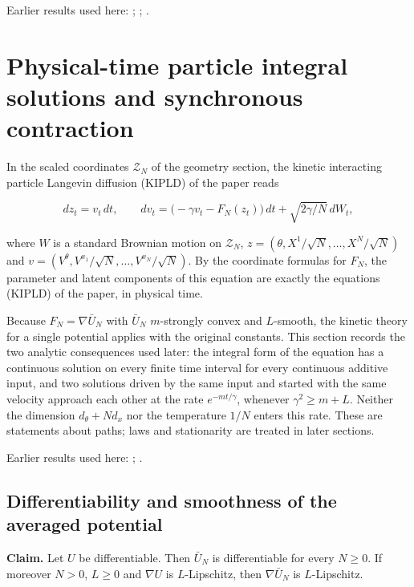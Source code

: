 \documentclass[11pt,a4paper]{report}
\begin{document}
Earlier results used here: \cite[Section~3.33.6]{LangevinLean2026ULASC}; \cite[Section~3.1.1]{LangevinLean2026IPLA}; \cite[Section~3.12.2]{LangevinLean2026Kinetic}.
\section{\texorpdfstring{Physical-time particle integral solutions and synchronous contraction}{Physical-time particle integral solutions and synchronous contraction}}
\label{proof-module-KIPLMC-Dynamics-lean}


In the scaled coordinates \(\mathcal Z_N\) of the geometry section, the kinetic interacting particle Langevin diffusion (KIPLD) of the paper reads


\[dz_t=v_t\,dt,\qquad dv_t=\bigl(-\gamma v_t-F_N(z_t)\bigr)\,dt+\sqrt{2\gamma/N}\,dW_t,\]


where \(W\) is a standard Brownian motion on \(\mathcal Z_N\), \(z=(\theta,X^1/\sqrt N,\dots,X^N/\sqrt N)\) and \(v=(V^\theta,V^{x_1}/\sqrt N,\dots,V^{x_N}/\sqrt N)\). By the coordinate formulas for \(F_N\), the parameter and latent components of this equation are exactly the equations (KIPLD) of the paper, in physical time.




Because \(F_N=\nabla\bar U_N\) with \(\bar U_N\) \(m\)-strongly convex and \(L\)-smooth, the kinetic theory for a single potential applies with the original constants. This section records the two analytic consequences used later: the integral form of the equation has a continuous solution on every finite time interval for every continuous additive input, and two solutions driven by the same input and started with the same velocity approach each other at the rate \(e^{-mt/\gamma}\), whenever \(\gamma^2\ge m+L\). Neither the dimension \(d_\theta+Nd_x\) nor the temperature \(1/N\) enters this rate. These are statements about paths; laws and stationarity are treated in later sections.



Earlier results used here: \cite[Section~3.1]{LangevinLean2026Kinetic}; \cite[Section~3.6]{LangevinLean2026Kinetic}.
\subsection{\texorpdfstring{Differentiability and smoothness of the averaged potential}{Differentiability and smoothness of the averaged potential}}
\label{report-step-KIPLMC-Dynamics-lean-1}


\textbf{Claim.} Let \(U\) be differentiable. Then \(\bar U_N\) is differentiable for every \(N\ge0\). If moreover \(N>0\), \(L\ge0\) and \(\nabla U\) is \(L\)-Lipschitz, then \(\nabla\bar U_N\) is \(L\)-Lipschitz.
\end{document}
